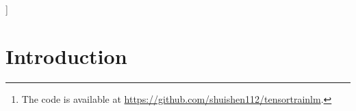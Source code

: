 \documentclass{article}
\theoremstyle{plain}
\theoremstyle{definition}
\theoremstyle{remark}
\begin{document}


\vskip 0.3in
]




\printAffiliationsAndNotice{\icmlEqualContribution} %

\begin{abstract}
We propose a novel tensor network language model based on the simplest tensor network (i.e., tensor trains), called `Tensor Train Language Model' (TTLM). TTLM represents sentences in an exponential space constructed by the tensor product of words, but computing the probabilities of sentences in a low-dimensional fashion. We demonstrate that the architectures of  Second-order RNNs, Recurrent Arithmetic Circuits (RACs), and Multiplicative Integration RNNs are, essentially, special cases of TTLM. Experimental evaluations on real language modeling tasks show that the proposed variants of TTLM (i.e., TTLM-Large and TTLM-Tiny) outperform the vanilla Recurrent Neural Networks (RNNs) with low-scale of hidden units. \footnote{The code is available at \url{https://github.com/shuishen112/tensortrainlm}.}
\end{abstract}

\section{Introduction}

\end{document}
